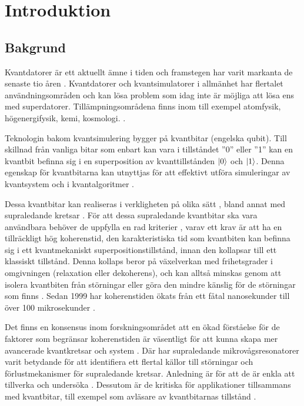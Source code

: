 \documentclass[main.tex]{subfiles}
\begin{document}
\chapter{Introduktion}
\section{Bakgrund}
Kvantdatorer är ett aktuellt ämne i tiden och framstegen har varit markanta de senaste tio åren \cite{Bylander2017}. Kvantdatorer och kvantsimulatorer i allmänhet har flertalet användningsområden och kan lösa problem som idag inte är möjliga att lösa ens med superdatorer. Tillämpningsområdena finns inom till exempel atomfysik, högenergifysik, kemi, kosmologi. \cite{applications}.

Teknologin bakom kvantsimulering bygger på kvantbitar (engelska qubit). Till skillnad från vanliga bitar som enbart kan vara i tillståndet ''0'' eller ''1'' kan en kvantbit befinna sig i en superposition av kvanttillstånden $\ket{0}$ och $\ket{1}$. Denna egenskap för kvantbitarna kan utnyttjas för att effektivt utföra simuleringar av kvantsystem och i kvantalgoritmer \cite{Eckstein2013}.

Dessa kvantbitar kan realiseras i verkligheten på olika sätt \cite{Eckstein2013}, bland annat med supraledande kretsar \cite{Oliver2013}. För att dessa supraledande kvantbitar ska vara användbara behöver de uppfylla en rad kriterier \cite{Eckstein2013}, varav ett krav är att ha en tillräckligt hög koherenstid, den karakteristiska tid som kvantbiten kan befinna sig i ett kvantmekaniskt superpositionstillstånd, innan den kollapsar till ett klassiskt tillstånd. Denna kollaps beror på växelverkan med frihetsgrader i omgivningen (relaxation eller dekoherens), och kan alltså minskas genom att isolera kvantbiten från störningar eller göra den mindre känslig för de störningar som finns \cite{Oliver2013}. Sedan 1999 har koherenstiden ökats från ett fåtal nanosekunder till över 100 mikrosekunder \cite{wendin2016}.

Det finns en konsensus inom forskningsområdet att en ökad förståelse för de faktorer som begränsar koherenstiden är väsentligt för att kunna skapa mer avancerade kvantkretsar och system \cite{Oliver2013}. Där har supraledande mikrovågsresonatorer varit betydande för att identifiera ett flertal källor till störningar och förlustmekanismer för supraledande kretsar. Anledning är för att de är enkla att tillverka och undersöka \cite{Oliver2013}. Dessutom är de kritiska för applikationer tillsammans med kvantbitar, till exempel som avläsare av kvantbitarnas tillstånd \cite{wendin2016}.
\end{document}
